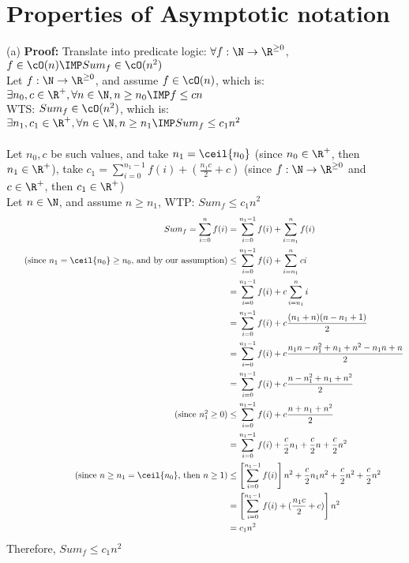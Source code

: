 \documentclass[12pt]{article}
\begin{document}
\section{Properties of Asymptotic notation}
(a) \textbf{Proof:} Translate into predicate logic: $\forall f: \N \to \R^{\ge 0}$, $f \in \cO(n) \IMP Sum_f \in \cO(n^2)$\\
Let $f: \N \to \R^{\ge 0}$, and assume $f \in \cO(n)$, which is: $\exists n_0,c \in \R^{+}, \forall n \in \N, n \ge n_0 \IMP f \le cn$\\
WTS: $Sum_f \in \cO(n^2)$, which is: $\exists n_1, c_1 \in \R^{+}, \forall n \in \N, n \ge n_1 \IMP Sum_f \le c_1n^2$\\
\\
Let $n_0, c$ be such values, and take $n_1 = \ceil{n_0}$ (since $n_0 \in \R^{+}$, then $n_1 \in \R^{+}$), take $c_1 = \sum_{i = 0}^{n_1 - 1}f(i) + (\frac{n_1c}{2} + c)$ (since $f: \N \to \R^{\ge 0}$ and $c \in \R^{+}$, then $c_1 \in \R^{+}$)\\ 
Let $n \in \N$, and assume $n \ge n_1$, WTP: $Sum_f \le c_1n^2$\\
\begin{align*}
    Sum_f = \sum_{i = 0}^{n}f(i) &= \sum_{i = 0}^{n_1 - 1}f(i) + \sum_{i= n_1}^{n}f(i)\\
    \tag{since $n_1 = \ceil{n_0} \ge n_0$, and by our assumption}
    &\le \sum_{i = 0}^{n_1 - 1}f(i) + \sum_{i = n_1}^{n}ci\\
    &= \sum_{i = 0}^{n_1 - 1}f(i) + c\sum_{i = n_1}^{n}i\\
    &= \sum_{i = 0}^{n_1 - 1}f(i) + c\frac{(n_1 + n)(n - n_1 + 1)}{2}\\
    &= \sum_{i = 0}^{n_1 - 1}f(i) + c\frac{n_1n-n_1^2+n_1+n^2-n_1n+n}{2}\\
    &= \sum_{i = 0}^{n_1 - 1}f(i) + c\frac{n-n_1^2+n_1+n^2}{2}\\
    \tag{since $n_1^2 \ge 0$}
    &\le \sum_{i = 0}^{n_1 - 1}f(i) + c\frac{n+n_1+n^2}{2}\\
    &= \sum_{i = 0}^{n_1 - 1}f(i) + \frac{c}{2}n_1 + \frac{c}{2}n + \frac{c}{2}n^2\\
    \tag{since $n \ge n_1 = \ceil{n_0}$, then $n \ge 1$}
    &\le \left[\sum_{i = 0}^{n_1 - 1}f(i)\right]n^2 + \frac{c}{2}n_1n^2 + \frac{c}{2}n^2 + \frac{c}{2}n^2\\
    &= \left[\sum_{i=0}^{n_1-1}f(i) + (\frac{n_1c}{2} +c)\right]n^2\\
    &= c_1n^2
\end{align*}
Therefore, $Sum_f \le c_1n^2$\\
\end{document}
